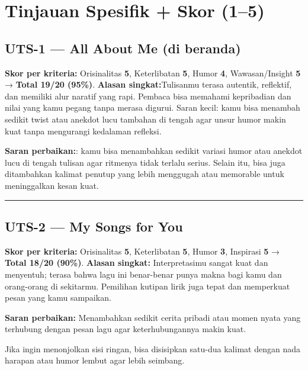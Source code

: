 \documentclass[
  letterpaper,
  DIV=11,
  numbers=noendperiod]{scrreprt}
\begin{document}
\section{Tinjauan Spesifik + Skor
(1--5)}\label{tinjauan-spesifik-skor-15}

\subsection{UTS-1 --- All About Me (di
beranda)}\label{uts-1-all-about-me-di-beranda}

\textbf{Skor per kriteria:} Orisinalitas \textbf{5}, Keterlibatan
\textbf{5}, Humor \textbf{4}, Wawasan/Insight \textbf{5} → \textbf{Total
19/20 (95\%)}. \textbf{Alasan singkat:}Tulisanmu terasa autentik,
reflektif, dan memiliki alur naratif yang rapi. Pembaca bisa memahami
kepribadian dan nilai yang kamu pegang tanpa merasa digurui. Saran
kecil: kamu bisa menambah sedikit twist atau anekdot lucu tambahan di
tengah agar unsur humor makin kuat tanpa mengurangi kedalaman refleksi.

\textbf{Saran perbaikan:}: kamu bisa menambahkan sedikit variasi humor
atau anekdot lucu di tengah tulisan agar ritmenya tidak terlalu serius.
Selain itu, bisa juga ditambahkan kalimat penutup yang lebih menggugah
atau memorable untuk meninggalkan kesan kuat.

\begin{center}\rule{0.5\linewidth}{0.5pt}\end{center}

\subsection{UTS-2 --- My Songs for You}\label{uts-2-my-songs-for-you-1}

\textbf{Skor per kriteria:} Orisinalitas \textbf{5}, Keterlibatan
\textbf{5}, Humor \textbf{3}, Inspirasi \textbf{5} → \textbf{Total 18/20
(90\%)}. \textbf{Alasan singkat:} Interpretasimu sangat kuat dan
menyentuh; terasa bahwa lagu ini benar-benar punya makna bagi kamu dan
orang-orang di sekitarmu. Pemilihan kutipan lirik juga tepat dan
memperkuat pesan yang kamu sampaikan.

\textbf{Saran perbaikan:} Menambahkan sedikit cerita pribadi atau momen
nyata yang terhubung dengan pesan lagu agar keterhubungannya makin kuat.

Jika ingin menonjolkan sisi ringan, bisa disisipkan satu-dua kalimat
dengan nada harapan atau humor lembut agar lebih seimbang.
\end{document}

